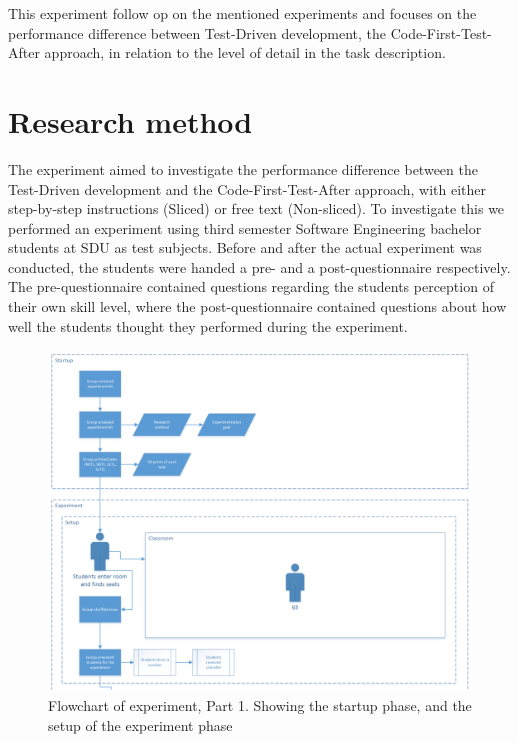 \documentclass{sig-alternate-05-2015}
\begin{document}
This  experiment follow op on the mentioned experiments and focuses on the performance difference between Test-Driven development, the Code-First-Test-After approach, in relation to the level of detail in the task description.

\vfill
\eject

\section{Research method}
\label{sec:Research method}
The experiment aimed to investigate the performance difference between the Test-Driven development and the Code-First-Test-After approach, with either step-by-step instructions (Sliced) or free text (Non-sliced). To investigate this we performed an experiment using third semester Software Engineering bachelor students at SDU as test subjects.
Before and after the actual experiment was conducted, the students were handed a pre- and a post-questionnaire respectively.
The pre-questionnaire contained questions regarding the students perception of their own skill level, where the post-questionnaire contained questions about how well the students thought they performed during the experiment.

\begin{figure}[!ht]
\hspace*{-3.73in}
	\centering
	\includegraphics[width=2.13\linewidth]{flow01}
	\caption{Flowchart of experiment, Part 1. Showing the startup phase, and the setup of the experiment phase}
	\label{fig:Flowchart1}
\end{figure}
\clearpage
\end{document}
